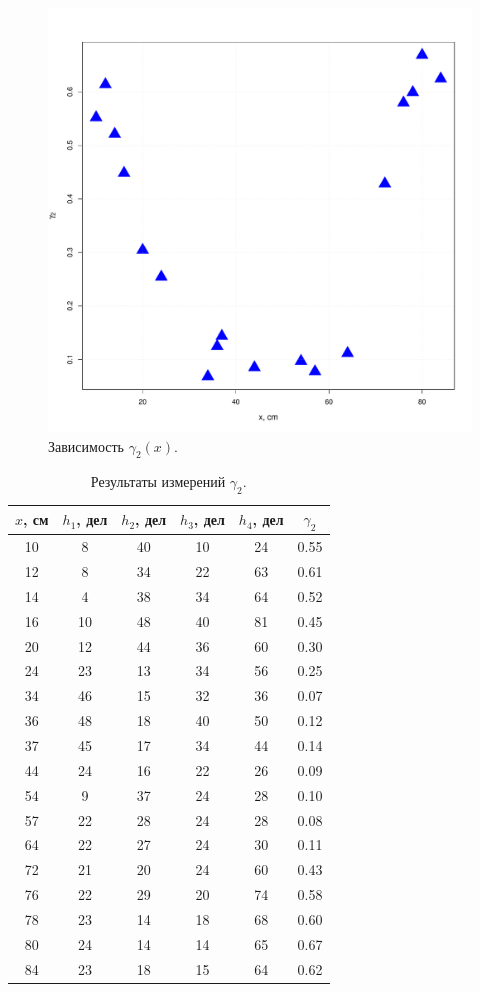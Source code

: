 \documentclass[a4paper,12pt]{article}
\begin{document}
\begin{figure}[H]
\includegraphics[scale=0.4]{g2.pdf}
\centering
\caption{Зависимость $\gamma_2(x)$.}
\end{figure}
\begin{table}[H]
\begin{tabular}{|c|c|c|c|c|c|}
\hline
$x$, см & $h_1$, дел & $h_2$, дел & $h_3$, дел & $h_4$, дел & $\gamma_2$ \\ \hline
10 & 8 & 40 & 10 & 24 & 0.55 \\ \hline
12 & 8 & 34 & 22 & 63 & 0.61 \\ \hline
14 & 4 & 38 & 34 & 64 & 0.52 \\ \hline
16 & 10 & 48 & 40 & 81 & 0.45 \\ \hline
20 & 12 & 44 & 36 & 60 & 0.30 \\ \hline
24 & 23 & 13 & 34 & 56 & 0.25 \\ \hline
34 & 46 & 15 & 32 & 36 & 0.07 \\ \hline
36 & 48 & 18 & 40 & 50 & 0.12 \\ \hline
37 & 45 & 17 & 34 & 44 & 0.14 \\ \hline
44 & 24 & 16 & 22 & 26 & 0.09 \\ \hline
54 & 9 & 37 & 24 & 28 & 0.10 \\ \hline
57 & 22 & 28 & 24 & 28 & 0.08 \\ \hline
64 & 22 & 27 & 24 & 30 & 0.11 \\ \hline
72 & 21 & 20 & 24 & 60 & 0.43 \\ \hline
76 & 22 & 29 & 20 & 74 & 0.58 \\ \hline
78 & 23 & 14 & 18 & 68 & 0.60 \\ \hline
80 & 24 & 14 & 14 & 65 & 0.67 \\ \hline
84 & 23 & 18 & 15 & 64 & 0.62 \\ \hline

\end{tabular}
\centering
\caption{Результаты измерений $\gamma_2$.}
\end{table}
\end{document}
